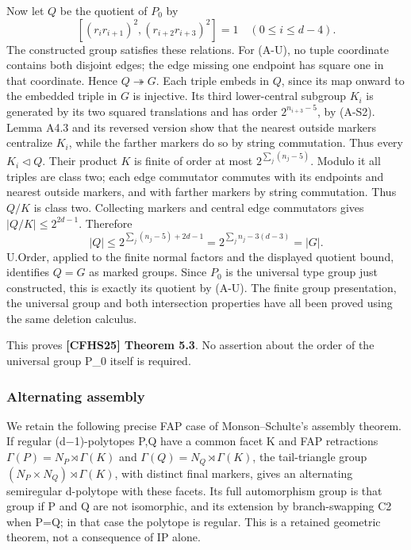 \documentclass[
  11pt,
  a4paper,
]{article}
\begin{document}
Now let \(Q\) be the quotient of \(P_0\) by \[
 [(r_i r_{i+1})^2,(r_{i+2}r_{i+3})^2]=1
 \quad(0\le i\le d-4).                                  \tag{A-U}
\] The constructed group satisfies these relations. For (A-U), no tuple
coordinate contains both disjoint edges; the edge missing one endpoint
has square one in that coordinate. Hence \(Q\twoheadrightarrow G\). Each
triple embeds in \(Q\), since its map onward to the embedded triple in
\(G\) is injective. Its third lower-central subgroup \(K_i\) is
generated by its two squared translations and has order
\(2^{n_{i+3}-5}\), by (A-S2). Lemma A4.3 and its reversed version show
that the nearest outside markers centralize \(K_i\), while the farther
markers do so by string commutation. Thus every \(K_i\lhd Q\). Their
product \(K\) is finite of order at most \(2^{\sum_j(n_j-5)}\). Modulo
it all triples are class two; each edge commutator commutes with its
endpoints and nearest outside markers, and with farther markers by
string commutation. Thus \(Q/K\) is class two. Collecting markers and
central edge commutators gives \(|Q/K|\le2^{2d-1}\). Therefore \[
 |Q|\le2^{\sum_j(n_j-5)+2d-1}
      =2^{\sum_j n_j-3(d-3)}=|G|.
\] U.Order, applied to the finite normal factors and the displayed
quotient bound, identifies \(Q=G\) as marked groups. Since \(P_0\) is
the universal type group just constructed, this is exactly its quotient
by (A-U). The finite group presentation, the universal group and both
intersection properties have all been proved using the same deletion
calculus.

This proves \textbf{{[}CFHS25{]} Theorem 5.3}. No assertion about the
order of the universal group P\_0 itself is required.

\subsubsection{Alternating assembly}\label{alternating-assembly}

We retain the following precise FAP case of Monson--Schulte's assembly
theorem. If regular (d−1)-polytopes P,Q have a common facet K and FAP
retractions \(\Gamma(P)=N_P\rtimes\Gamma(K)\) and
\(\Gamma(Q)=N_Q\rtimes\Gamma(K)\), the tail-triangle group
\((N_P\times N_Q)\rtimes\Gamma(K)\), with distinct final markers, gives
an alternating semiregular d-polytope with these facets. Its full
automorphism group is that group if P and Q are not isomorphic, and its
extension by branch-swapping C2 when P=Q; in that case the polytope is
regular. This is a retained geometric theorem, not a consequence of IP
alone.
\end{document}

